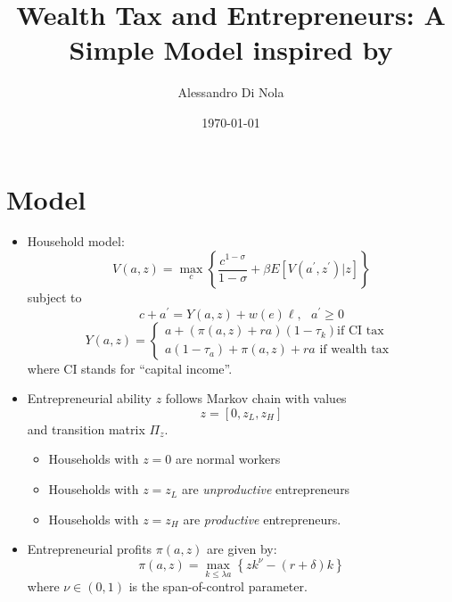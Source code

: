 \documentclass[12pt]{article}
\begin{document}
\title{\textbf{Wealth Tax and Entrepreneurs: A Simple Model inspired by \cite%
{guvenen2023}}}
\date{\today }
\author{Alessandro Di Nola}
\maketitle

\section{Model}

\begin{itemize}
\item Household model:%
\begin{equation*}
V(a,z)=\max_{c}\left\{ \frac{c^{1-\sigma }}{1-\sigma }+\beta E\left[
V(a^{\prime },z^{\prime })|z\right] \right\} 
\end{equation*}%
subject to%
\begin{equation*}
c+a^{\prime }=Y(a,z)+w(e)\ell ,\ \ \ a^{\prime }\geq 0
\end{equation*}%
\begin{equation*}
Y(a,z)=\left\{ 
\begin{array}{c}
a+\left( \pi \left( a,z\right) +ra\right) \left( 1-\tau _{k}\right) \text{
if CI tax} \\ 
a\left( 1-\tau _{a}\right) +\pi \left( a,z\right) +ra\text{ if wealth tax }%
\end{array}%
\right. 
\end{equation*}%
where CI stands for \textquotedblleft capital income\textquotedblright .

\item Entrepreneurial ability $z$ follows Markov chain with values 
\begin{equation*}
z=[0,z_{L},z_{H}]
\end{equation*}%
and transition matrix $\Pi _{z}$.

\begin{itemize}
\item Households with $z=0$ are normal workers

\item Households with $z=z_{L}$ are \textit{unproductive} entrepreneurs

\item Households with $z=z_{H}$ are \textit{productive} entrepreneurs.
\end{itemize}

\item Entrepreneurial profits $\pi (a,z)$ are given by:%
\begin{equation*}
\pi (a,z)=\max_{k\leq \lambda a}\left\{ zk^{\nu }-(r+\delta )k\right\} 
\end{equation*}%
where $\nu \in (0,1)$ is the span-of-control parameter.
\end{itemize}
\end{document}
